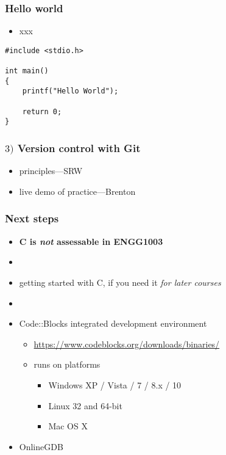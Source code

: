 \documentclass[english,14pt]{beamer}
\begin{document}

\begin{frame}[fragile]

\frametitle{Hello world}

\begin{itemize}
	\item xxx
\end{itemize}

\begin{lstlisting}[style=CStyle,basicstyle=\normalsize]
#include <stdio.h>

int main()
{
    printf("Hello World");

    return 0;
}
\end{lstlisting}

\end{frame}


\begin{frame}[fragile]

\frametitle{$3)$ Version control with Git}

\begin{itemize}
	\item principles---SRW
	\item live demo of practice---Brenton
\end{itemize}

\end{frame}


\begin{frame}[fragile]

\frametitle{Next steps}
\begin{itemize}
	\item[]\textbf{C is \emph{not} assessable in ENGG1003}
	\item[]
	\item getting started with C, if you need it \emph{for later courses}		
	\item[]
	\item Code::Blocks integrated development environment
	\begin{itemize}
		\item \href{https://www.codeblocks.org/downloads/binaries/}{https://www.codeblocks.org/downloads/binaries/}
		\item runs on platforms
		\begin{itemize}
			\item Windows XP / Vista / 7 / 8.x / 10
			\item Linux 32 and 64-bit
			\item Mac OS X
		\end{itemize}
	\end{itemize}
	\item OnlineGDB
\end{itemize}
	
\end{frame}
\end{document}
